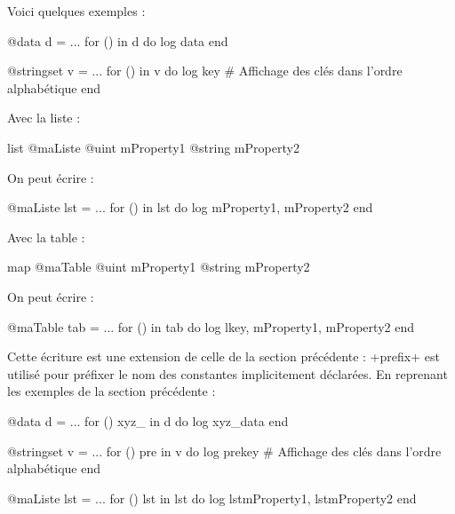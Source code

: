 Voici quelques exemples :
\begin{galgas}
@data d = ...
for () in d do
  log data
end
\end{galgas}



\begin{galgas}
@stringset v = ...
for () in v do
  log key # Affichage des clés dans l'ordre alphabétique
end
\end{galgas}

Avec la liste :
\begin{galgas}
list @maListe {
  @uint mProperty1
  @string mProperty2
}
\end{galgas}

On peut écrire :

\begin{galgas}
@maListe lst = ...
for () in lst do
  log mProperty1, mProperty2
end
\end{galgas}


Avec la table :
\begin{galgas}
map @maTable {
  @uint mProperty1
  @string mProperty2
}
\end{galgas}

On peut écrire :

\begin{galgas}
@maTable tab = ...
for () in tab do
  log lkey, mProperty1, mProperty2
end
\end{galgas}



Cette écriture est une extension de celle de la section précédente : \ggs+prefix+ est utilisé pour préfixer le nom des constantes implicitement déclarées. En reprenant les exemples de la section précédente :

\begin{galgas}
@data d = ...
for () xyz_ in d do
  log xyz_data
end
\end{galgas}



\begin{galgas}
@stringset v = ...
for () pre in v do
  log prekey # Affichage des clés dans l'ordre alphabétique
end
\end{galgas}


\begin{galgas}
@maListe lst = ...
for () lst in lst do
  log lstmProperty1, lstmProperty2
end
\end{galgas}


